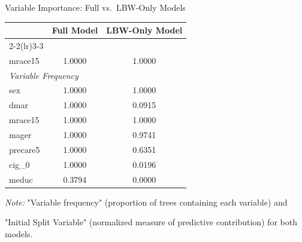 \documentclass[aspectratio=169,professionalfonts]{beamer}
\begin{document}
\begin{frame}{Variable Importance: Full vs.\ LBW-Only Models}

\small        %
\centering

\begin{tabular}{@{}lcc@{}}
\toprule
                & \multicolumn{1}{c}{\textbf{Full Model}} & \multicolumn{1}{c}{\textbf{LBW-Only Model}} \\
\cmidrule(lr){2-2}\cmidrule(lr){3-3}
\multicolumn{3}{l}{\emph{Initial Split Variable}} \\
\midrule
mrace15         & 1.0000 & 1.0000 \\
\midrule
\multicolumn{3}{l}{\emph{Variable Frequency}} \\
\midrule
sex             & 1.0000 & 1.0000 \\
dmar            & 1.0000 & 0.0915 \\
mrace15         & 1.0000 & 1.0000 \\
mager           & 1.0000 & 0.9741 \\
precare5        & 1.0000 & 0.6351 \\
cig\_0          & 1.0000 & 0.0196 \\
meduc           & 0.3794 & 0.0000 \\
\bottomrule
\end{tabular}

\medskip
\scriptsize
\textit{Note:} "Variable frequency" (proportion of trees containing each variable) and

"Initial Split Variable" (normalized measure of predictive contribution) for both models.
\end{frame}
\end{document}
